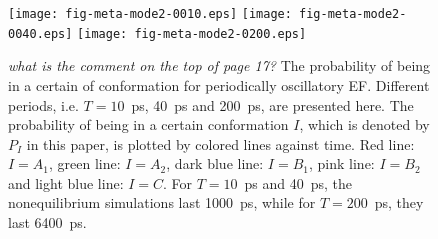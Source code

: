 \documentclass[a4paper,preprint,unsortedaddress,onecolumn]{revtex4-1}
\newcommand{\bluec}[1]{{\color{blue} #1}}
\begin{document}
\begin{figure}
  \centering
  \texttt{[image: fig-meta-mode2-0010.eps]}
  \texttt{[image: fig-meta-mode2-0040.eps]}
  \texttt{[image: fig-meta-mode2-0200.eps]}
  \caption{
    \bluec{\textit{what is the comment on the top of page 17?}}
    The probability of being in a certain of conformation for
    periodically oscillatory EF. Different periods,
    i.e. $T=10$~ps, 40~ps and 200~ps, are presented here.  The
    probability of being in a certain conformation $I$, which is
    denoted by $P_I$ in this paper, is plotted by colored lines against
    time. Red line: $I = A_1$,  green line: $I = A_2$,  dark
    blue line: $I = B_1$,  pink line: $I = B_2$ and  light blue
    line: $I = C$. For $T=10$~ps and 40~ps, the nonequilibrium
    simulations last 1000~ps, while for $T=200$~ps,
    they last 6400~ps.  }
  \label{fig:tmp9}
\end{figure}
\end{document}
